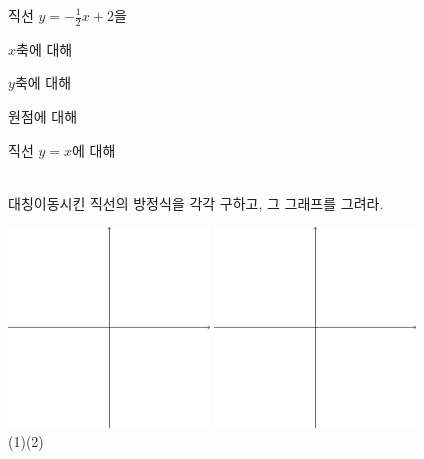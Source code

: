 \documentclass{oblivoir}
\begin{document}
\newpage
%
\prob{}\label{rreflect7}
직선 \(y=-\frac12x+2\)을\\[10pt]
\begin{enumerate*}[itemjoin={,\quad}]
\item
\(x\)축에 대해
\item
\(y\)축에 대해
\item
원점에 대해
\item
직선 \(y=x\)에 대해
\end{enumerate*}
\\[10pt]
대칭이동시킨 직선의 방정식을 각각 구하고, 그 그래프를 그려라.
\bigskip
\begin{center}
\includegraphics[width=0.4\textwidth]{xyaxes}\quad
\includegraphics[width=0.4\textwidth]{xyaxes}\\
(1)\qquad\qquad\qquad\qquad\qquad\qquad\quad(2)
\end{center}
\end{document}

